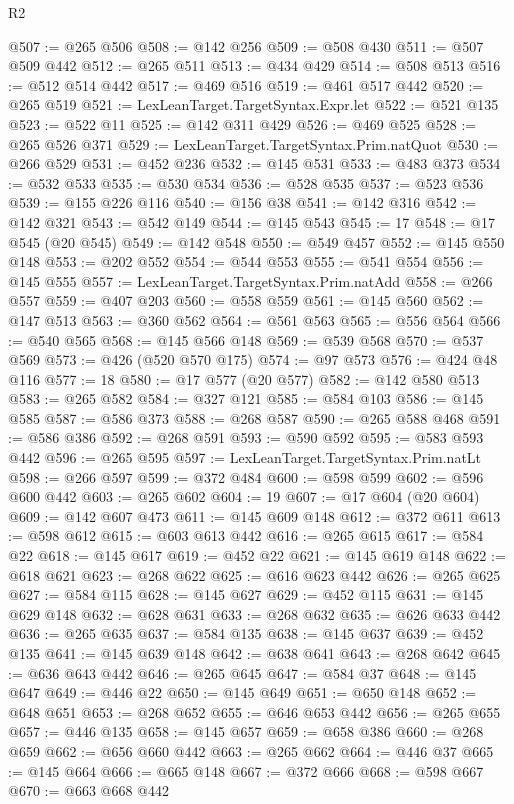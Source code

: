 \begin{lexlean}{R2}
\begin{coremodule}
@507 := @265 @506
@508 := @142 @256
@509 := @508 @430
@511 := @507 @509 @442
@512 := @265 @511
@513 := @434 @429
@514 := @508 @513
@516 := @512 @514 @442
@517 := @469 @516
@519 := @461 @517 @442
@520 := @265 @519
@521 := LexLeanTarget.TargetSyntax.Expr.let
@522 := @521 @135
@523 := @522 @11
@525 := @142 @311 @429
@526 := @469 @525
@528 := @265 @526 @371
@529 := LexLeanTarget.TargetSyntax.Prim.natQuot
@530 := @266 @529
@531 := @452 @236
@532 := @145 @531
@533 := @483 @373
@534 := @532 @533
@535 := @530 @534
@536 := @528 @535
@537 := @523 @536
@539 := @155 @226 @116
@540 := @156 @38
@541 := @142 @316
@542 := @142 @321
@543 := @542 @149
@544 := @145 @543
@545 := 17
@548 := @17 @545 (@20 @545)
@549 := @142 @548
@550 := @549 @457
@552 := @145 @550 @148
@553 := @202 @552
@554 := @544 @553
@555 := @541 @554
@556 := @145 @555
@557 := LexLeanTarget.TargetSyntax.Prim.natAdd
@558 := @266 @557
@559 := @407 @203
@560 := @558 @559
@561 := @145 @560
@562 := @147 @513
@563 := @360 @562
@564 := @561 @563
@565 := @556 @564
@566 := @540 @565
@568 := @145 @566 @148
@569 := @539 @568
@570 := @537 @569
@573 := @426 (@520 @570 @175)
@574 := @97 @573
@576 := @424 @48 @116
@577 := 18
@580 := @17 @577 (@20 @577)
@582 := @142 @580 @513
@583 := @265 @582
@584 := @327 @121
@585 := @584 @103
@586 := @145 @585
@587 := @586 @373
@588 := @268 @587
@590 := @265 @588 @468
@591 := @586 @386
@592 := @268 @591
@593 := @590 @592
@595 := @583 @593 @442
@596 := @265 @595
@597 := LexLeanTarget.TargetSyntax.Prim.natLt
@598 := @266 @597
@599 := @372 @484
@600 := @598 @599
@602 := @596 @600 @442
@603 := @265 @602
@604 := 19
@607 := @17 @604 (@20 @604)
@609 := @142 @607 @473
@611 := @145 @609 @148
@612 := @372 @611
@613 := @598 @612
@615 := @603 @613 @442
@616 := @265 @615
@617 := @584 @22
@618 := @145 @617
@619 := @452 @22
@621 := @145 @619 @148
@622 := @618 @621
@623 := @268 @622
@625 := @616 @623 @442
@626 := @265 @625
@627 := @584 @115
@628 := @145 @627
@629 := @452 @115
@631 := @145 @629 @148
@632 := @628 @631
@633 := @268 @632
@635 := @626 @633 @442
@636 := @265 @635
@637 := @584 @135
@638 := @145 @637
@639 := @452 @135
@641 := @145 @639 @148
@642 := @638 @641
@643 := @268 @642
@645 := @636 @643 @442
@646 := @265 @645
@647 := @584 @37
@648 := @145 @647
@649 := @446 @22
@650 := @145 @649
@651 := @650 @148
@652 := @648 @651
@653 := @268 @652
@655 := @646 @653 @442
@656 := @265 @655
@657 := @446 @135
@658 := @145 @657
@659 := @658 @386
@660 := @268 @659
@662 := @656 @660 @442
@663 := @265 @662
@664 := @446 @37
@665 := @145 @664
@666 := @665 @148
@667 := @372 @666
@668 := @598 @667
@670 := @663 @668 @442

\end{coremodule}
\end{lexlean}
